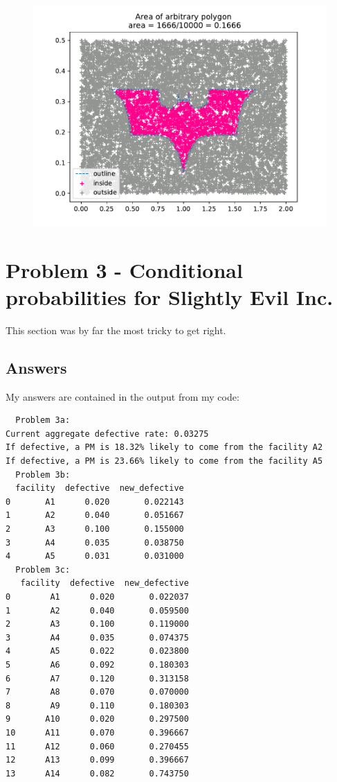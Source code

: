 \documentclass[a4paper,11pt]{article}
\begin{document}
\begin{figure}[]
  \includegraphics{../p2_bat.pdf}
  \label{p2_bat}
\end{figure}


\section{Problem 3 - Conditional probabilities for Slightly Evil Inc.}

This section was by far the most tricky to get right.
\subsection{Answers}
My answers are contained in the output from my code:
\begin{verbatim}
  Problem 3a:
Current aggregate defective rate: 0.03275
If defective, a PM is 18.32% likely to come from the facility A2
If defective, a PM is 23.66% likely to come from the facility A5
  Problem 3b:
  facility  defective  new_defective
0       A1      0.020       0.022143
1       A2      0.040       0.051667
2       A3      0.100       0.155000
3       A4      0.035       0.038750
4       A5      0.031       0.031000
  Problem 3c:
   facility  defective  new_defective
0        A1      0.020       0.022037
1        A2      0.040       0.059500
2        A3      0.100       0.119000
3        A4      0.035       0.074375
4        A5      0.022       0.023800
5        A6      0.092       0.180303
6        A7      0.120       0.313158
7        A8      0.070       0.070000
8        A9      0.110       0.180303
9       A10      0.020       0.297500
10      A11      0.070       0.396667
11      A12      0.060       0.270455
12      A13      0.099       0.396667
13      A14      0.082       0.743750
\end{verbatim}
\end{document}
